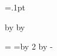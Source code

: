 
%
%
%

%
%
\newdimen\totalwidth
\newdimen\totalheight
\newdimen\hmargin
\newdimen\vmargin

\newdimen\barwidth
\newdimen\barheight


%
%


\totalwidth=29.7cm
\totalheight=21cm
\hmargin=6mm
\vmargin=6mm

%
%
\barwidth=.1pt			%
\barheight=2pt			%



\def\vdecor{\hskip\hmargin plus1fil
\vbox to \vsize{\hbox to \barwidth{\vrule height\barheight width\barwidth}\vfill
\hbox to \barwidth{\vrule height\barheight width\barwidth}}%
\hskip\hmargin plus1fil}


%
%
\newdimen\fullhsize		%
\newdimen\itemwidth		%
\newdimen{}	%
\newdimen\temp			%

\hoffset=-1in \advance \hoffset by \hmargin
\voffset=-1in \advance \voffset by \vmargin

\fullhsize=\totalwidth
\temp=\hmargin \multiply \temp by 2 \advance \fullhsize by -\temp

